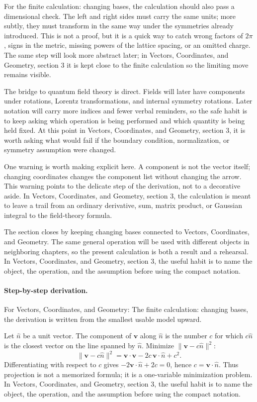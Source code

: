 For the finite calculation: changing bases, the calculation should also pass a dimensional check.  The left and right sides must carry the same units; more subtly, they must transform in the same way under the symmetries already introduced.  This is not a proof, but it is a quick way to catch wrong factors of \(2\pi\), signs in the metric, missing powers of the lattice spacing, or an omitted charge.  The same step will look more abstract later; in Vectors, Coordinates, and Geometry, section 3 it is kept close to the finite calculation so the limiting move remains visible.

The bridge to quantum field theory is direct.  Fields will later have components under rotations, Lorentz transformations, and internal symmetry rotations.  Later notation will carry more indices and fewer verbal reminders, so the safe habit is to keep asking which operation is being performed and which quantity is being held fixed.  At this point in Vectors, Coordinates, and Geometry, section 3, it is worth asking what would fail if the boundary condition, normalization, or symmetry assumption were changed.

One warning is worth making explicit here.  A component is not the vector itself; changing coordinates changes the component list without changing the arrow.  This warning points to the delicate step of the derivation, not to a decorative aside.  In Vectors, Coordinates, and Geometry, section 3, the calculation is meant to leave a trail from an ordinary derivative, sum, matrix product, or Gaussian integral to the field-theory formula.

The section closes by keeping changing bases connected to Vectors, Coordinates, and Geometry.  The same general operation will be used with different objects in neighboring chapters, so the present calculation is both a result and a rehearsal.  In Vectors, Coordinates, and Geometry, section 3, the useful habit is to name the object, the operation, and the assumption before using the compact notation.



\paragraph{Step-by-step derivation.}

For Vectors, Coordinates, and Geometry: The finite calculation: changing bases, the derivation is written from the smallest usable model upward.

Let \(\hat n\) be a unit vector.  The component of \(\bm v\) along \(\hat n\) is the number \(c\) for which \(c\hat n\) is the closest vector on the line spanned by \(\hat n\).  Minimize \(\|\bm v-c\hat n\|^2\):
\[
  \|\bm v-c\hat n\|^2=\bm v\cdot\bm v-2c\,\bm v\cdot\hat n+c^2.
\]
Differentiating with respect to \(c\) gives \(-2\bm v\cdot\hat n+2c=0\), hence \(c=\bm v\cdot\hat n\).  Thus projection is not a memorized formula; it is a one-variable minimization problem.  In Vectors, Coordinates, and Geometry, section 3, the useful habit is to name the object, the operation, and the assumption before using the compact notation.

